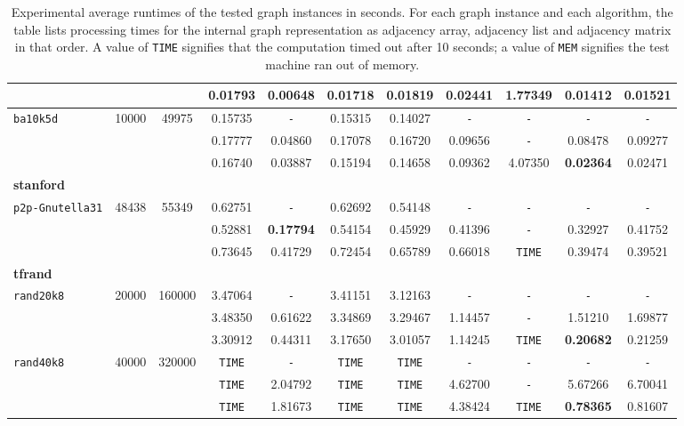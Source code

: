 \begin{table}
{\begin{tabular}{ l c c | c c c c c c c c }
 &  &  & 0.01793 & \textbf{0.00648} & 0.01718 & 0.01819 & 0.02441 & 1.77349 & 0.01412 & 0.01521 \\
\hline
\verb|ba10k5d| & 10000 & 49975 & 0.15735 & \verb|-| & 0.15315 & 0.14027 & \verb|-| & \verb|-| & \verb|-| & \verb|-| \\
 &  &  & 0.17777 & 0.04860 & 0.17078 & 0.16720 & 0.09656 & \verb|-| & 0.08478 & 0.09277 \\
 &  &  & 0.16740 & 0.03887 & 0.15194 & 0.14658 & 0.09362 & 4.07350 & \textbf{0.02364} & 0.02471 \\
\hline
\multicolumn{11}{l}{\textbf{stanford}} \\
\hline
\verb|p2p-Gnutella31| & 48438 & 55349 & 0.62751 & \verb|-| & 0.62692 & 0.54148 & \verb|-| & \verb|-| & \verb|-| & \verb|-| \\
 &  &  & 0.52881 & \textbf{0.17794} & 0.54154 & 0.45929 & 0.41396 & \verb|-| & 0.32927 & 0.41752 \\
 &  &  & 0.73645 & 0.41729 & 0.72454 & 0.65789 & 0.66018 & \verb|TIME| & 0.39474 & 0.39521 \\
\hline
\multicolumn{11}{l}{\textbf{tfrand}} \\
\hline
\verb|rand20k8| & 20000 & 160000 & 3.47064 & \verb|-| & 3.41151 & 3.12163 & \verb|-| & \verb|-| & \verb|-| & \verb|-| \\
 &  &  & 3.48350 & 0.61622 & 3.34869 & 3.29467 & 1.14457 & \verb|-| & 1.51210 & 1.69877 \\
 &  &  & 3.30912 & 0.44311 & 3.17650 & 3.01057 & 1.14245 & \verb|TIME| & \textbf{0.20682} & 0.21259 \\
\hline
\verb|rand40k8| & 40000 & 320000 & \verb|TIME| & \verb|-| & \verb|TIME| & \verb|TIME| & \verb|-| & \verb|-| & \verb|-| & \verb|-| \\
 &  &  & \verb|TIME| & 2.04792 & \verb|TIME| & \verb|TIME| & 4.62700 & \verb|-| & 5.67266 & 6.70041 \\
 &  &  & \verb|TIME| & 1.81673 & \verb|TIME| & \verb|TIME| & 4.38424 & \verb|TIME| & \textbf{0.78365} & 0.81607 \\
\hline
  \end{tabular}
}
\caption{Experimental average runtimes of the tested graph instances in seconds. For each graph instance and each algorithm, the table lists processing times for the internal graph representation as adjacency array, adjacency list and adjacency matrix in that order. A value of \texttt{TIME} signifies that the computation timed out after 10 seconds; a value of \texttt{MEM} signifies the test machine ran out of memory.}
\label{results}
\end{table}

